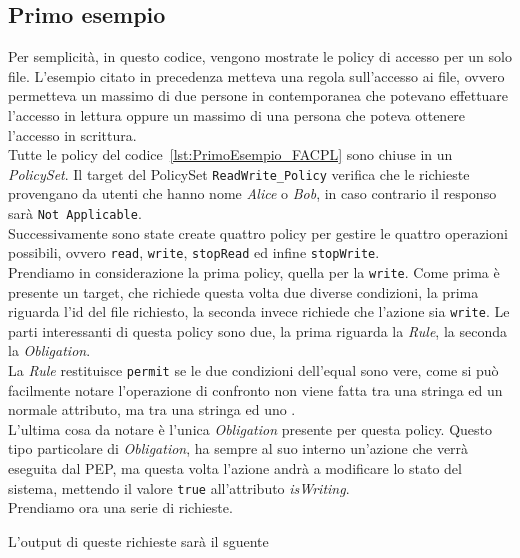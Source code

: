 \subsection{Primo esempio} %
\label{ssub:primo_esempio}

Per semplicità, in questo codice, vengono mostrate le policy di accesso per un solo file.
L'esempio citato in precedenza metteva una regola sull'accesso ai file, ovvero permetteva un massimo di due persone in contemporanea che potevano effettuare l'accesso in lettura oppure un massimo di una persona che poteva ottenere l'accesso in scrittura.\\
Tutte le policy del codice~\ref{lst:PrimoEsempio_FACPL} sono chiuse in un \textit{PolicySet}. Il target del PolicySet \texttt{ReadWrite\_Policy} verifica che le richieste provengano da utenti che hanno nome \textit{Alice} o \textit{Bob}, in caso contrario il responso sarà \texttt{Not Applicable}.\\
Successivamente sono state create quattro policy per gestire le quattro operazioni possibili, ovvero \texttt{read}, \texttt{write}, \texttt{stopRead} ed infine \texttt{stopWrite}.\\
Prendiamo in considerazione la prima policy, quella per la \texttt{write}. Come prima è presente un target, che richiede questa volta due diverse condizioni, la prima riguarda l'id del file richiesto, la seconda invece richiede che l'azione sia \texttt{write}. Le parti interessanti di questa policy sono due, la prima riguarda la \textit{Rule}, la seconda la \textit{Obligation}.\\
La \textit{Rule} restituisce \texttt{permit} se le due condizioni dell'equal sono vere, come si può facilmente notare l'operazione di confronto non viene fatta tra una stringa ed un normale attributo, ma tra una stringa ed uno \statusattribute.\\
L'ultima cosa da notare è l'unica \textit{Obligation} presente per questa policy. Questo tipo particolare di \textit{Obligation}, ha sempre al suo interno un'azione che verrà eseguita dal PEP, ma questa volta l'azione andrà a modificare lo stato del sistema, mettendo il valore \texttt{true} all'attributo \textit{isWriting}.\\
Prendiamo ora una serie di richieste.

L'output di queste richieste sarà il sguente
